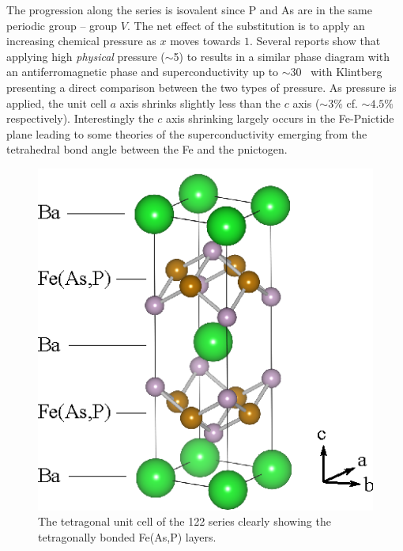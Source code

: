  The progression along the series is isovalent since P and As are in the same periodic group -- group $V$. The net effect of the substitution is to apply an increasing chemical pressure as $x$ moves towards $1$. Several reports show that applying high \emph{physical} pressure ($\sim$\unit{5}{\giga\pascal}) to \BaFeAs{} results in a similar phase diagram with an antiferromagnetic phase and superconductivity up to $\sim$\unit{30}{\kelvin}~\cite{Yamazaki2010,Colombier2009,Alireza2009} with Klintberg \etal~\cite{Klintberg2010} presenting a direct comparison between the two types of pressure. As pressure is applied, the unit cell $a$ axis shrinks slightly less than the $c$ axis ($\sim3\%$ cf. $\sim4.5\%$ respectively). Interestingly the $c$ axis shrinking largely occurs in the Fe-Pnictide plane leading to some theories of the superconductivity emerging from the tetrahedral bond angle between the Fe and the pnictogen.
\begin{figure}[htbp]
    \begin{center}
        \includegraphics[scale=1.0]{Chapter-Introduction/Figures/UnitCell/UnitCell}
        \caption{The tetragonal unit cell of the 122 \BaFeAsP{} series clearly showing the tetragonally bonded Fe(As,P) layers.}
        \label{Fig:Intro:UnitCell}
    \end{center}
\end{figure}


